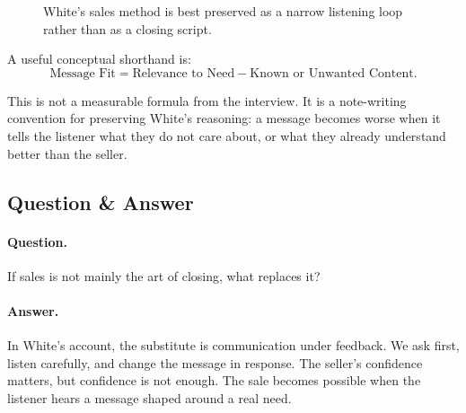 \begin{figure}
\centering
{}
\caption{White's sales method is best preserved as a narrow listening loop rather than as a closing script.}
\end{figure}

A useful conceptual shorthand is:
\begin{equation}
\text{Message Fit}
=
\text{Relevance to Need}
-
\text{Known or Unwanted Content}.
\end{equation}

This is not a measurable formula from the interview. It is a note-writing convention for preserving White's reasoning: a message becomes worse when it tells the listener what they do not care about, or what they already understand better than the seller.

\subsection{Question \& Answer}

\paragraph{Question.}
If sales is not mainly the art of closing, what replaces it?

\paragraph{Answer.}
In White's account, the substitute is communication under feedback. We ask first, listen carefully, and change the message in response. The seller's confidence matters, but confidence is not enough. The sale becomes possible when the listener hears a message shaped around a real need.

